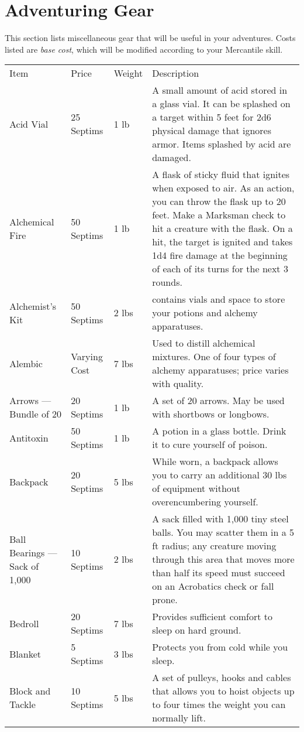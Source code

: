 \section{Adventuring Gear}
This section lists miscellaneous gear that will be useful in your adventures. Costs listed are \textit{base cost}, which will be modified according to your Mercantile skill.

{
\begin{longtable}{p{}llp{}}
	\rowcolor{gray!50}
	Item & Price & Weight & Description\\
	Acid Vial & 25 Septims & 1 lb & A small amount of acid stored in a glass vial. It can be splashed on a target within 5 feet for 2d6 physical damage that ignores armor. Items splashed by acid are damaged.\\
	Alchemical Fire & 50 Septims & 1 lb & A flask of sticky fluid that ignites when exposed to air. As an action, you can throw the flask up to 20 feet. Make a Marksman check to hit a creature with the flask. On a hit, the target is ignited and takes 1d4 fire damage at the beginning of each of its turns for the next 3 rounds.\\
	Alchemist's Kit & 50 Septims & 2 lbs & contains vials and space to store your potions and alchemy apparatuses.\\
	Alembic & Varying Cost & 7 lbs & Used to distill alchemical mixtures. One of four types of alchemy apparatuses; price varies with quality.\\
	Arrows --- Bundle of 20 & 20 Septims & 1 lb & A set of 20 arrows. May be used with shortbows or longbows.\\
	Antitoxin & 50 Septims & 1 lb & A potion in a glass bottle. Drink it to cure yourself of poison.\\
	Backpack & 20 Septims & 5 lbs & While worn, a backpack allows you to carry an additional 30 lbs of equipment without overencumbering yourself.\\
	Ball Bearings --- Sack of 1,000 & 10 Septims & 2 lbs & A sack filled with 1,000 tiny steel balls. You may scatter them in a 5 ft radius; any creature moving through this area that moves more than half its speed must succeed on an Acrobatics check or fall prone.\\
	Bedroll & 20 Septims & 7 lbs & Provides sufficient comfort to sleep on hard ground.\\
	Blanket & 5 Septims & 3 lbs & Protects you from cold while you sleep.\\
	Block and Tackle & 10 Septims & 5 lbs & A set of pulleys, hooks and cables that allows you to hoist objects up to four times the weight you can normally lift.\\

\end{longtable}}
